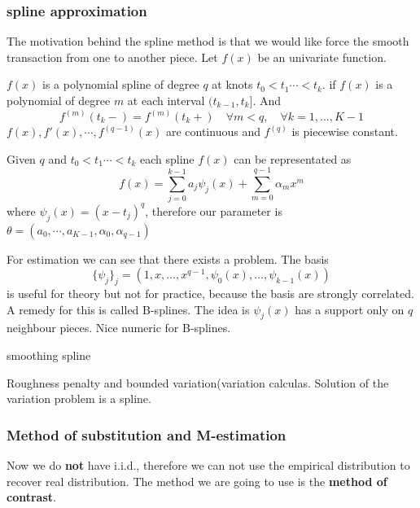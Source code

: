 \subsubsection*{spline approximation}	
The motivation behind the spline method is that we would like force the smooth transaction from one to another piece. Let $f(x)$ be an univariate function.
\begin{definition}
	$f(x)$ is a polynomial spline of degree $q$ at knots $t_0 < t_1 \cdots < t_k$. if $f(x)$ is a polynomial of degree $m$ at each interval $(t_{k-1}, t_k]$. And 
	\begin{equation*}
		f^{(m)} (t_k - ) = f^{(m)} (t_k + ) \quad \forall m < q, \quad \forall k = 1, \dots, K - 1
	\end{equation*}
	$f(x), f'(x), \cdots, f^{(q-1)}(x)$ are continuous and $f^{(q)}$ is piecewise constant.
\end{definition}

\begin{lemma}
	Given $q$ and $t_0 < t_1 \cdots < t_k$ each spline $f(x)$ can be representated as 
	\begin{equation}
		f(x) = \sum_{j = 0}^{k - 1} a_j \psi_j(x) + \sum_{m = 0}^{q - 1} \alpha_m x^m
	\end{equation}
	where $\psi_j(x) = (x - t_j)^q $, therefore our parameter is $\theta = (a_0, \cdots, a_{K- 1}, \alpha_0, \alpha_{q-1})$
\end{lemma}

For estimation we can see that there exists a problem. The basis
\[
	\{\psi_j\}_j = (1, x, \dots, x^{q - 1}, \psi_0(x), \dots, \psi_{k-1}(x))
\]
is useful for theory but not for practice, because the basis are strongly correlated. A remedy for this is called B-splines. The idea is $\psi_j(x)$ has a support only on $q$ neighbour pieces. Nice numeric for B-splines.

smoothing spline

Roughness penalty and bounded variation(variation calculas. Solution of the variation problem is a spline.

\subsubsection{Method of substitution and M-estimation}
Now we do \textbf{not} have i.i.d., therefore we can not use the empirical distribution to recover real distribution. The method we are going to use is the \textbf{method of contrast}.\par 

